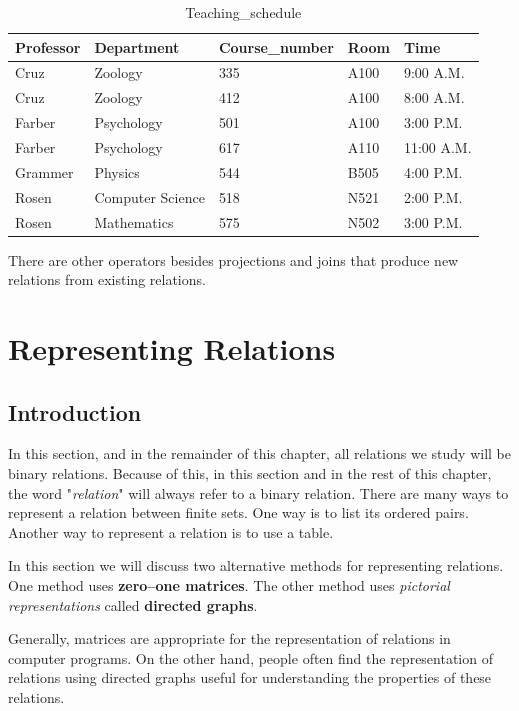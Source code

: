 \documentclass[11pt]{article}
\begin{document}
\begin{table}[!h]
    \centering
    \caption{Teaching\_schedule}
    \begin{tabular}{|l|l|l|l|l|}
        \hline
        Professor & Department & Course\_number & Room & Time \\ \hline
        Cruz & Zoology & 335 & A100 & 9:00 A.M. \\ \hline
        Cruz & Zoology & 412 & A100 & 8:00 A.M. \\ \hline
        Farber & Psychology & 501 & A100 & 3:00 P.M. \\ \hline
        Farber & Psychology & 617 & A110 & 11:00 A.M. \\ \hline
        Grammer & Physics & 544 & B505 & 4:00 P.M. \\ \hline
        Rosen & Computer Science & 518 & N521 & 2:00 P.M. \\ \hline
        Rosen & Mathematics & 575 & N502 & 3:00 P.M. \\ \hline

    \end{tabular}
    \label{tab:my_label}
\end{table}

There are other operators besides projections and joins that produce new relations from existing relations.


\section{Representing Relations}
\setcounter{figure}{0}

\subsection{Introduction}

In this section, and in the remainder of this chapter, all relations we study will be binary relations. Because of this, in this section and in the rest of this chapter, the word "\textit{relation}" will always refer to a binary relation. There are many ways to represent a relation between finite sets. One way is to list its ordered pairs. Another way to represent a relation is to
use a table. 

In this section we will discuss two alternative methods for representing relations. One method uses \textbf{zero–one matrices}. The other method uses
\textit{pictorial representations} called \textbf{directed graphs}.

Generally, matrices are appropriate for the representation of relations in computer programs. On the other hand, people often find the representation of relations using directed graphs useful for understanding the properties of these relations.
\end{document}
